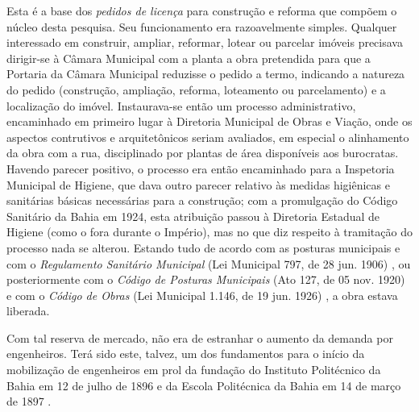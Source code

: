 Esta é a base dos \textit{pedidos de licença} para construção e reforma que compõem o núcleo desta pesquisa. Seu funcionamento era razoavelmente simples. Qualquer interessado em construir, ampliar, reformar, lotear ou parcelar imóveis precisava dirigir-se à Câmara Municipal com a planta a obra pretendida para que a Portaria da Câmara Municipal reduzisse o pedido a termo, indicando a natureza do pedido (construção, ampliação, reforma, loteamento ou parcelamento) e a localização do imóvel. Instaurava-se então um processo administrativo, encaminhado em primeiro lugar à Diretoria Municipal de Obras e Viação, onde os aspectos contrutivos e arquitetônicos seriam avaliados, em especial o alinhamento da obra com a rua, disciplinado por plantas de área disponíveis aos burocratas. Havendo parecer positivo, o processo era então encaminhado para a Inspetoria Municipal de Higiene, que dava outro parecer relativo às medidas higiênicas e sanitárias básicas necessárias para a construção; com a promulgação do Código Sanitário da Bahia em 1924, esta atribuição passou à Diretoria Estadual de Higiene (como o fora durante o Império), mas no que diz respeito à tramitação do processo nada se alterou. Estando tudo de acordo com as posturas municipais e com o \textit{Regulamento Sanitário Municipal} (Lei Municipal 797, de 28 jun. 1906) \cite{prefeitura_sanitario_1906}, ou posteriormente com o \textit{Código de Posturas Municipais} (Ato 127, de 05 nov. 1920) \cite{PREFEITURA1921} e com o \textit{Código de Obras} (Lei Municipal 1.146, de 19 jun. 1926) \cite{prefeitura_obras_1927}, a obra estava liberada.

Com tal reserva de mercado, não era de estranhar o aumento da demanda por engenheiros. Terá sido este, talvez, um dos fundamentos para o início da mobilização de engenheiros em prol da fundação do Instituto Politécnico da Bahia em 12 de julho de 1896 e da Escola Politécnica da Bahia em 14 de março de 1897 \cite[pp.~9-11]{costa_politecnica_2005}. 

